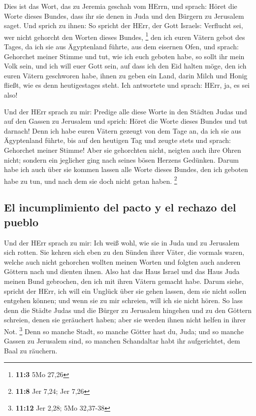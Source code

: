  Dies ist das Wort, das zu Jeremia geschah vom HErrn, und
sprach:  Höret die Worte dieses Bundes, dass ihr sie denen
in Juda und den Bürgern zu Jerusalem saget.  Und sprich zu
ihnen: So spricht der HErr, der Gott Israels: Verflucht sei, wer nicht
gehorcht den Worten dieses Bundes, \footnote{\textbf{11:3} 5Mo 27,26}
 den ich euren Vätern gebot des Tages, da ich sie aus
Ägyptenland führte, aus dem eisernen Ofen, und sprach: Gehorchet meiner
Stimme und tut, wie ich euch geboten habe, so sollt ihr mein Volk sein,
und ich will euer Gott sein,  auf dass ich den Eid halten
möge, den ich euren Vätern geschworen habe, ihnen zu geben ein Land,
darin Milch und Honig fließt, wie es denn heutigestages steht. Ich
antwortete und sprach: HErr, ja, es sei also!

 Und der HErr sprach zu mir: Predige alle diese Worte in
den Städten Judas und auf den Gassen zu Jerusalem und sprich: Höret die
Worte dieses Bundes und tut darnach!  Denn ich habe euren
Vätern gezeugt von dem Tage an, da ich sie aus Ägyptenland führte, bis
auf den heutigen Tag und zeugte stets und sprach: Gehorchet meiner
Stimme!  Aber sie gehorchten nicht, neigten auch ihre
Ohren nicht; sondern ein jeglicher ging nach seines bösen Herzens
Gedünken. Darum habe ich auch über sie kommen lassen alle Worte dieses
Bundes, den ich geboten habe zu tun, und nach dem sie doch nicht getan
haben. \footnote{\textbf{11:8} Jer 7,24; Jer 7,26}

\hypertarget{el-incumplimiento-del-pacto-y-el-rechazo-del-pueblo}{%
\subsection{El incumplimiento del pacto y el rechazo del
pueblo}\label{el-incumplimiento-del-pacto-y-el-rechazo-del-pueblo}}

 Und der HErr sprach zu mir: Ich weiß wohl, wie sie in
Juda und zu Jerusalem sich rotten.  Sie kehren sich eben
zu den Sünden ihrer Väter, die vormals waren, welche auch nicht
gehorchen wollten meinen Worten und folgten auch anderen Göttern nach
und dienten ihnen. Also hat das Haus Israel und das Haus Juda meinen
Bund gebrochen, den ich mit ihren Vätern gemacht habe. 
Darum siehe, spricht der HErr, ich will ein Unglück über sie gehen
lassen, dem sie nicht sollen entgehen können; und wenn sie zu mir
schreien, will ich sie nicht hören.  So lass denn die
Städte Judas und die Bürger zu Jerusalem hingehen und zu den Göttern
schreien, denen sie geräuchert haben; aber sie werden ihnen nicht helfen
in ihrer Not. \footnote{\textbf{11:12} Jer 2,28; 5Mo 32,37-38}
 Denn so manche Stadt, so manche Götter hast du, Juda;
und so manche Gassen zu Jerusalem sind, so manchen Schandaltar habt ihr
aufgerichtet, dem Baal zu räuchern.


